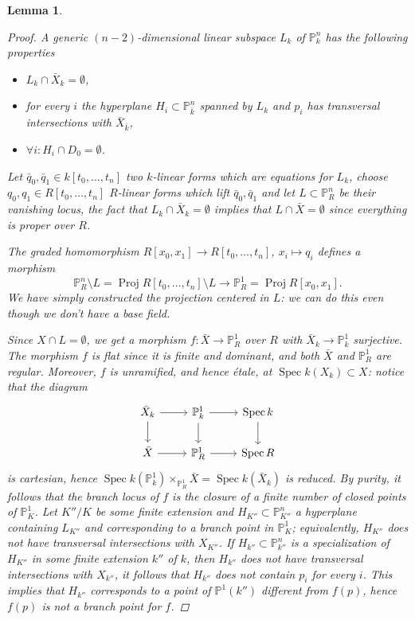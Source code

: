 \documentclass[11pt]{amsart}
\theoremstyle{plain}
\newtheorem{lemma}[theorem]{Lemma}
\theoremstyle{definition}
\newcommand{\on}{\operatorname}
\newcommand{\1}{\mathbb{1}}
\newcommand{\proj}{\on{Proj}}
\newcommand{\spec}{\on{Spec}}
\renewcommand{\P}{\mathbb{P}}
\begin{document}
\begin{lemma}
\begin{proof}
		A generic $(n-2)$-dimensional linear subspace $L_{k}$ of $\P^{n}_{k}$ has the following properties
		\begin{itemize}
			\item $L_{k}\cap \bar{X}_{k}=\emptyset$,
			\item for every $i$ the hyperplane $H_{i}\subset\P^{n}_{\bar{k}}$ spanned by $L_{k}$ and $p_{i}$ has transversal intersections with $\bar{X}_{\bar{k}}$,
			\item $\forall i:H_{i}\cap D_{0}=\emptyset$.
		\end{itemize}
		
		Let $\bar{q}_{0},\bar{q}_{1}\in k[t_{0},\dots,t_{n}]$ two $k$-linear forms which are equations for $L_{k}$, choose $q_{0},q_{1}\in R[t_{0},\dots,t_{n}]$ $R$-linear forms which lift $\bar{q}_{0},\bar{q}_{1}$ and let $L\subset\P^{n}_{R}$ be their vanishing locus, the fact that $L_{k}\cap \bar{X}_{k}=\emptyset$ implies that $L\cap \bar{X}=\emptyset$ since everything is proper over $R$.
		
		The graded homomorphism $R[x_{0},x_{1}]\to R[t_{0},\dots,t_{n}]$, $x_{i}\mapsto q_{i}$ defines a morphism 
		\[\P^{n}_{R}\setminus L=\proj R[t_{0},\dots,t_{n}]\setminus L\to\P^{1}_{R}=\proj R[x_{0},x_{1}].\]
		We have simply constructed the projection centered in $L$: we can do this even though we don't have a base field.
		
		Since $X\cap L=\emptyset$, we get a morphism $f:\bar{X}\to\P^{1}_{R}$ over $R$ with $\bar{X}_{k}\to\P^{1}_{k}$ surjective. The morphism $f$ is flat since it is finite and dominant, and both $\bar{X}$ and $\P^{1}_{R}$ are regular. Moreover, $f$ is unramified, and hence étale, at $\spec k(X_{k})\subset X$: notice that the diagram
		\[\begin{tikzcd}
			\bar{X}_{k}\rar\dar	&	\P^{1}_{k}\rar\dar	&	\spec k\dar	\\
			\bar{X}\rar			&	\P^{1}_{R}\rar		&	\spec R
		\end{tikzcd}\]
		is cartesian, hence $\spec k(\P^{1}_{k})\times_{\P^{1}_{R}}\bar{X}=\spec k(\bar{X}_{k})$ is reduced. By purity, it follows that the branch locus of $f$ is the closure of a finite number of closed points of $\P^{1}_{K}$. Let $K''/K$ be some finite extension and $H_{K''}\subset \P^{n}_{K''}$ a hyperplane containing $L_{K''}$ and corresponding to a branch point in $\P^{1}_{K}$; equivalently, $H_{K''}$ does not have transversal intersections with $X_{K''}$. If $H_{k''}\subset \P^{n}_{k''}$ is a specialization of $H_{K''}$ in some finite extension $k''$ of $k$, then $H_{k''}$ does not have transversal intersections with $X_{k''}$, it follows that $H_{k''}$ does not contain $p_{i}$ for every $i$. This implies that $H_{k''}$ corresponds to a point of $\P^{1}(k'')$ different from $f(p)$, hence $f(p)$ is not a branch point for $f$.
		

\end{proof}
\end{lemma}
\end{document}
